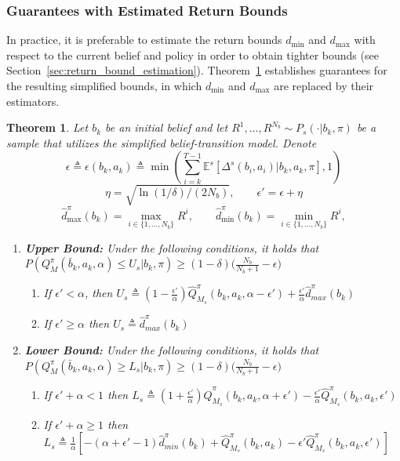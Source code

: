 \documentclass[acmlarge, manuscript, screen, review, natbib=false, oneside]{acmart}
\newtheorem{theorem}{Theorem}[section]
\begin{document}
\subsubsection{Guarantees with Estimated Return Bounds}
In practice, it is preferable to estimate the return bounds $d_{\min}$ and $d_{\max}$ with respect to the current belief and policy in order to obtain tighter bounds (see Section~\ref{sec:return_bound_estimation}). Theorem~\ref{thm:guarantees} establishes guarantees for the resulting simplified bounds, in which $d_{\min}$ and $d_{\max}$ are replaced by their estimators.
\begin{theorem}\label{thm:guarantees}
	Let $b_k$ be an initial belief and let $R^1,\dots,R^{N_b} \sim P_s(\cdot | b_k,\pi)$ be a sample that utilizes the simplified belief-transition model. Denote \begin{equation}
		\epsilon \triangleq \epsilon(b_k, a_k) \triangleq \min(\sum_{i=k}^{T-1} \mathbb{E}^s[\Delta^s(b_i, a_i)|b_k, a_k,\pi], 1)
	\end{equation}
	\begin{equation}
		\eta = \sqrt{\ln(1/\delta)/(2N_b)}, \qquad \epsilon' = \epsilon + \eta
	\end{equation}
	\begin{equation}
		\hat{d}_{\max}^\pi(b_k) = \max_{i \in \{1,\dots,N_b\}} R^i, 
		\qquad
		\hat{d}_{\min}^\pi(b_k) = \min_{i \in \{1,\dots,N_b\}} R^i,
	\end{equation}
	
	\begin{enumerate}
		\item \textbf{Upper Bound:} Under the following conditions, it holds that $P(Q^\pi_{M}(\bar{b}_k, a_k, \alpha)\leq U_s|b_k,\pi)\geq (1-\delta)\Big(\frac{N_b}{N_b+1} -\epsilon \Big)$
		\begin{enumerate}
			\item If $\epsilon'<\alpha$, then
			$U_s\triangleq (1-\frac{\epsilon'}{\alpha}) \hat{Q}^\pi_{M_s}(b_k,a_k,\alpha-\epsilon') + \frac{\epsilon'}{\alpha}\hat{d}_{max}^\pi(b_k)$
			\item If $\epsilon' \geq \alpha$ then $U_s\triangleq \hat{d}_{max}^\pi(b_k)$
		\end{enumerate}
		\item \textbf{Lower Bound:} Under the following conditions, it holds that $P(Q^\pi_{M}(\bar{b}_k, a_k, \alpha)\geq L_s|b_k,\pi)\geq (1-\delta)\Big(\frac{N_b}{N_b+1} -\epsilon \Big)$
		\begin{enumerate}
			\item If $\epsilon' + \alpha < 1$ then 
			$
			L_s\triangleq (1+\frac{\epsilon'}{\alpha}) \hat{Q}^\pi_{M_s}(b_k,a_k,\alpha+\epsilon') - \frac{\epsilon'}{\alpha} \hat{Q}^\pi_{M_s}(b_k,a_k, \epsilon')
			$
			\item If $\epsilon' + \alpha \geq 1$ then 
			$
			L_s\triangleq\frac{1}{\alpha}[-(\alpha + \epsilon' - 1)\hat{d}_{min}^\pi(b_k)+\hat{Q}^\pi_{M_s}(b_k,a_k)-\epsilon' \hat{Q}^\pi_{M_s}(b_k,a_k,\epsilon')]
			$
		\end{enumerate}
	\end{enumerate}
\end{theorem}
\end{document}

